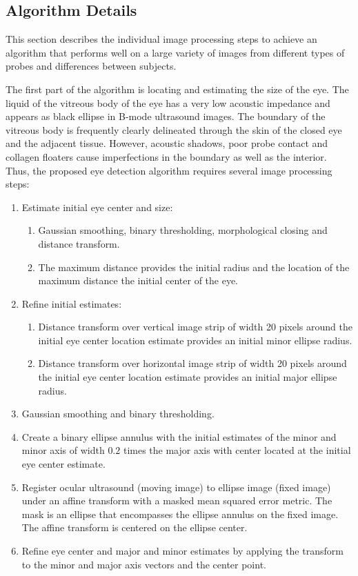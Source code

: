 \documentclass{llncs}
\begin{document}
\subsection{Algorithm Details}
\label{sec:details}
This section describes the individual image processing steps to achieve an
algorithm that performs well on a large variety of images from different types
of probes and differences between subjects.

The first part of the algorithm is locating and estimating the size of the eye.
The liquid of the vitreous body of the eye has a very low acoustic impedance and
appears as black ellipse in B-mode ultrasound images. The boundary of the
vitreous body is frequently clearly delineated through the skin of the closed
eye and the adjacent tissue. However, acoustic shadows, poor probe contact and
collagen floaters cause imperfections in the boundary as well as the interior.
Thus, the proposed eye detection algorithm requires several image processing
steps: 
\begin{enumerate}
\item Estimate initial eye center and size:
  \begin{enumerate}
  \item Gaussian smoothing, binary thresholding, morphological closing and
        distance transform.
  \item The maximum distance provides the initial radius and the location of
        the maximum distance the initial center of the eye.
\end{enumerate}
\item Refine initial estimates:
  \begin{enumerate}
  \item Distance transform over vertical image strip of width 20 pixels
        around the initial eye center location estimate provides an initial
        minor ellipse radius.
  \item Distance transform over horizontal image strip of width 20 pixels 
        around the initial eye center location estimate provides an initial major
        ellipse radius.
  \end{enumerate}
\item Gaussian smoothing and binary thresholding.
\item Create a binary ellipse annulus with the initial estimates of the minor and
      minor axis of width $0.2$ times the major axis with center located at the
      initial eye center estimate.
\item Register ocular ultrasound (moving image) to ellipse image (fixed image)
      under an affine transform with a masked mean squared error metric. The
      mask is an ellipse that encompasses the ellipse annulus on the fixed
      image. The affine transform is centered on the ellipse center.
\item Refine eye center and major and minor estimates by applying the transform to
      the minor and major axis vectors and the center point.
\end{enumerate}
\end{document}
